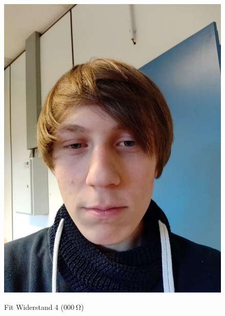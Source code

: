 \documentclass[12pt,twoside,a4paper]{scrartcl}
\begin{document}
\begin{figure}[H]
\begin{minipage}{0.4 \textwidth}
{						\includegraphics[width = \textwidth]{Pictures/Platzhalter}
					}
				\caption{Fit Widerstand 4 ($\SI{000}{\ohm}$)}
				\end{minipage}
		\end{figure}
\end{document}
